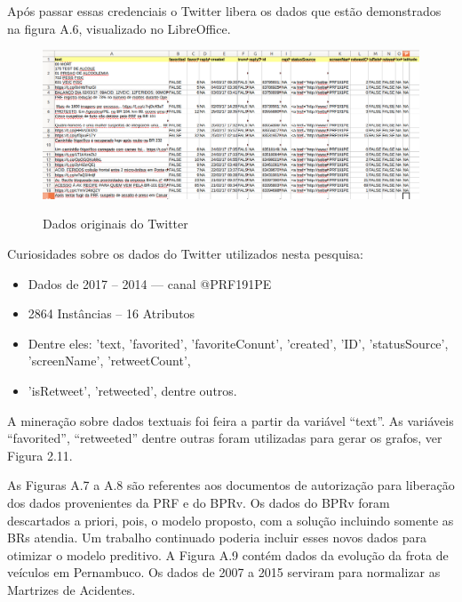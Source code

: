 Após passar essas credenciais o Twitter libera os dados que estão demonstrados na figura A.6, visualizado no LibreOffice.

\begin{figure}[ht!]
	\centering
	\caption{Dados originais do Twitter}
	\includegraphics[width=0.9\linewidth]{Figuras/Anexos/tweetPRF}
	\label{fig:workflow Twitter}
\end{figure}

Curiosidades sobre os dados do Twitter utilizados nesta pesquisa:
\begin{itemize}
	\item Dados de 2017 -- 2014 --- canal @PRF191PE
	\item 2864 Instâncias -- 16 Atributos
	\item Dentre eles: 'text, 'favorited', 'favoriteConunt', 'created', 'ID', 'statusSource', 'screenName', 'retweetCount',
	\item 'isRetweet', 'retweeted', dentre outros.		
\end{itemize}

A mineração sobre dados textuais foi feira a partir da variável ``text''. As variáveis ``favorited'', ``retweeted'' dentre outras foram utilizadas para gerar os grafos, ver Figura 2.11.

As Figuras A.7 a A.8 são referentes aos documentos de autorização para liberação dos dados provenientes da PRF e do BPRv.
Os dados do BPRv foram descartados a priori, pois, o modelo proposto, com a solução incluindo somente as BRs atendia. Um trabalho continuado poderia incluir esses novos dados para otimizar o modelo preditivo. A Figura A.9 contém dados da evolução da frota de veículos em Pernambuco. Os dados de 2007 a 2015 serviram para normalizar as Martrizes de Acidentes.


\pagebreak

